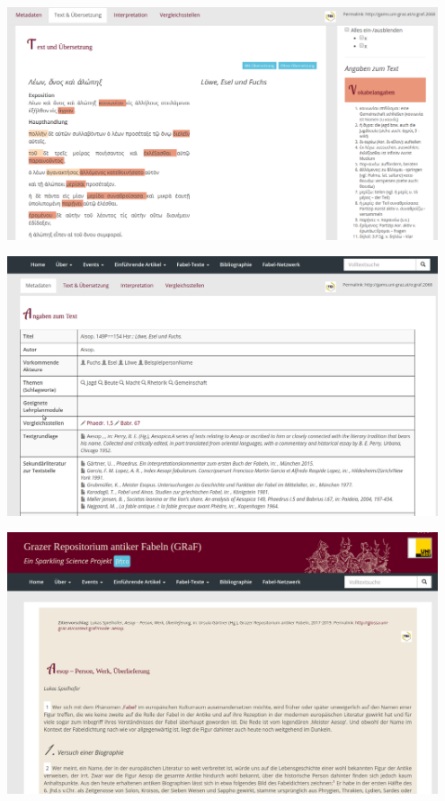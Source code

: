 \documentclass[14pt, a2paper, portrait,innermargin=5mm,
blockverticalspace=5mm, colspace=5mm, subcolspace=3mm]{tikzposter}
\begin{document}
{\begin{minipage}[t]{0.28\textwidth}
\end{minipage}\hfill\hspace{0.5em}
\begin{minipage}[t]{0.26\textwidth}\vspace{0pt}
\begin{tikzfigure}
            \includegraphics[width=0.95\textwidth]{text.png}
        \end{tikzfigure}
        \begin{tikzfigure}
            \includegraphics[width=0.95\textwidth]{angaben.png}
        \end{tikzfigure}
        \begin{tikzfigure}
            \includegraphics[width=0.95\textwidth]{intro.png}
        \end{tikzfigure}


\end{minipage}}
\end{document}
